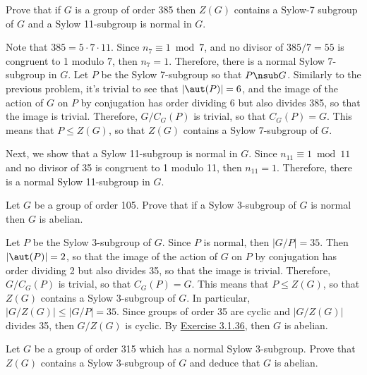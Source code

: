 \begin{exercise}\label{ex4.5.25}
	Prove that if $G$ is a group of order 385 then $Z(G)$ contains a Sylow-7 subgroup of $G$ and a Sylow 11-subgroup is normal in $G$.
\end{exercise}

\begin{sol}
	Note that $385 = 5 \cdot 7 \cdot 11$. Since $n_7 \equiv 1 \bmod 7$, and no divisor of $385/7 = 55$ is congruent to 1 modulo 7, then $n_7 = 1$. Therefore, there is a normal Sylow 7-subgroup in $G$. Let $P$ be the Sylow 7-subgroup so that $P \nsub G$. Similarly to the previous problem, it's trivial to see that $|\aut(P)| = 6$, and the image of the action of $G$ on $P$ by conjugation has order dividing 6 but also divides 385, so that the image is trivial. Therefore, $G/C_G(P)$ is trivial, so that $C_G(P) = G$. This means that $P \leq Z(G)$, so that $Z(G)$ contains a Sylow 7-subgroup of $G$.

	Next, we show that a Sylow 11-subgroup is normal in $G$. Since $n_{11} \equiv 1 \bmod 11$ and no divisor of 35 is congruent to 1 modulo 11, then $n_{11} = 1$. Therefore, there is a normal Sylow 11-subgroup in $G$.
\end{sol}

\begin{exercise}\label{ex4.5.26}
	Let $G$ be a group of order 105. Prove that if a Sylow 3-subgroup of $G$ is normal then $G$ is abelian.
\end{exercise}

\begin{sol}
	Let $P$ be the Sylow 3-subgroup of $G$. Since $P$ is normal, then $|G/P| = 35$. Then $|\aut(P)| = 2$, so that the image of the action of $G$ on $P$ by conjugation has order dividing 2 but also divides 35, so that the image is trivial. Therefore, $G/C_G(P)$ is trivial, so that $C_G(P) = G$. This means that $P \leq Z(G)$, so that $Z(G)$ contains a Sylow 3-subgroup of $G$. In particular, $|G/Z(G)| \leq |G/P| = 35$. Since groups of order 35 are cyclic and $|G/Z(G)|$ divides 35, then $G/Z(G)$ is cyclic. By \hyperref[ex3.1.36]{Exercise 3.1.36}, then $G$ is abelian.
\end{sol}

\begin{exercise}\label{ex4.5.27}
	Let $G$ be a group of order 315 which has a normal Sylow 3-subgroup. Prove that $Z(G)$ contains a Sylow 3-subgroup of $G$ and deduce that $G$ is abelian.
\end{exercise}

